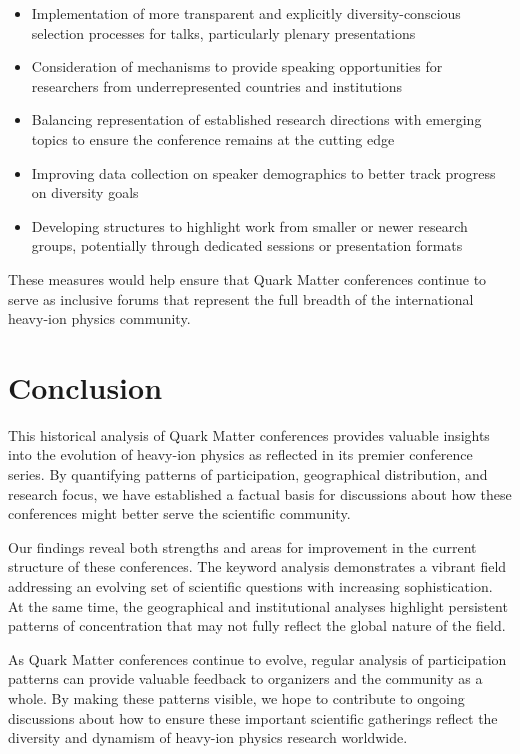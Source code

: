 \documentclass[a4paper,11pt]{article}
\begin{document}
\begin{itemize}
    \item Implementation of more transparent and explicitly diversity-conscious selection processes for talks, particularly plenary presentations
    \item Consideration of mechanisms to provide speaking opportunities for researchers from underrepresented countries and institutions
    \item Balancing representation of established research directions with emerging topics to ensure the conference remains at the cutting edge
    \item Improving data collection on speaker demographics to better track progress on diversity goals
    \item Developing structures to highlight work from smaller or newer research groups, potentially through dedicated sessions or presentation formats
\end{itemize}

These measures would help ensure that Quark Matter conferences continue to serve as inclusive forums that represent the full breadth of the international heavy-ion physics community.

\section{Conclusion}

This historical analysis of Quark Matter conferences provides valuable insights into the evolution of heavy-ion physics as reflected in its premier conference series. By quantifying patterns of participation, geographical distribution, and research focus, we have established a factual basis for discussions about how these conferences might better serve the scientific community.

Our findings reveal both strengths and areas for improvement in the current structure of these conferences. The keyword analysis demonstrates a vibrant field addressing an evolving set of scientific questions with increasing sophistication. At the same time, the geographical and institutional analyses highlight persistent patterns of concentration that may not fully reflect the global nature of the field.

As Quark Matter conferences continue to evolve, regular analysis of participation patterns can provide valuable feedback to organizers and the community as a whole. By making these patterns visible, we hope to contribute to ongoing discussions about how to ensure these important scientific gatherings reflect the diversity and dynamism of heavy-ion physics research worldwide.
\end{document}
